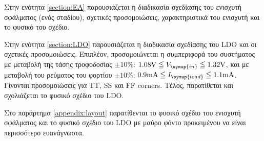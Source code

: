 Στην ενότητα \ref{section:EA} παρουσιάζεται η διαδικασία σχεδίασης του ενισχυτή σφάλματος (ενός σταδίου), σχετικές προσομοιώσεις, χαρακτηριστικά του ενισχυτή και το φυσικό του σχέδιο.\par
Στην ενότητα \ref{section:LDO} παρουσιάζεται η διαδικασία σχεδίασης του LDO και οι σχετικές προσομοιώσεις. Επιπλέον, προσομοιώνεται η συμπεριφορά του συστήματος με μεταβολή της τάσης τροφοδοσίας $\pm10\%$: $1.08\unit{\volt}\leqq V_{\symup{in}}\leqq 1.32\unit{\volt}$, και με μεταβολή του ρεύματος του φορτίου $\pm10\%$: $0.9\unit{\milli\ampere}\leqq I_{\symup{load}}\leqq 1.1\unit{\milli\ampere}$. Γίνονται προσομοιώσεις για TT, SS και FF corners. Τέλος, παρατίθεται και σχολιάζεται το φυσικό σχέδιο του LDO.\par
Στο παράρτημα \ref{appendix:layout} παρατίθενται το φυσικό σχέδιο του ενισχυτή σφάλματος και το φυσικό σχέδιο του LDO με μαύρο φόντο προκειμένου να είναι περισσότερο ευανάγνωστα.\par